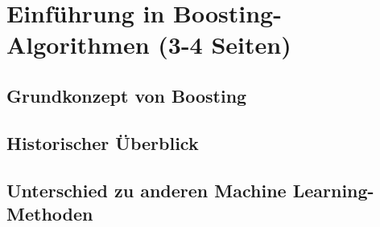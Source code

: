 \section{Einführung in Boosting-Algorithmen (3-4 Seiten)}
\subsection{Grundkonzept von Boosting}
\subsection{Historischer Überblick}
\subsection{Unterschied zu anderen Machine Learning-Methoden}